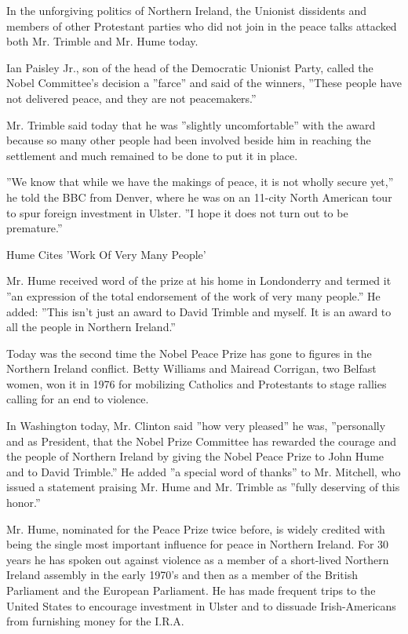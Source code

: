 In the unforgiving politics of Northern Ireland, the Unionist dissidents
and members of other Protestant parties who did not join in the peace
talks attacked both Mr. Trimble and Mr. Hume today.

Ian Paisley Jr., son of the head of the Democratic Unionist Party,
called the Nobel Committee's decision a ''farce'' and said of the
winners, ''These people have not delivered peace, and they are not
peacemakers.''

Mr. Trimble said today that he was ''slightly uncomfortable'' with the
award because so many other people had been involved beside him in
reaching the settlement and much remained to be done to put it in place.

''We know that while we have the makings of peace, it is not wholly
secure yet,'' he told the BBC from Denver, where he was on an 11-city
North American tour to spur foreign investment in Ulster. ''I hope it
does not turn out to be premature.''

Hume Cites 'Work Of Very Many People'

Mr. Hume received word of the prize at his home in Londonderry and
termed it ''an expression of the total endorsement of the work of very
many people.'' He added: ''This isn't just an award to David Trimble and
myself. It is an award to all the people in Northern Ireland.''

Today was the second time the Nobel Peace Prize has gone to figures in
the Northern Ireland conflict. Betty Williams and Mairead Corrigan, two
Belfast women, won it in 1976 for mobilizing Catholics and Protestants
to stage rallies calling for an end to violence.

In Washington today, Mr. Clinton said ''how very pleased'' he was,
''personally and as President, that the Nobel Prize Committee has
rewarded the courage and the people of Northern Ireland by giving the
Nobel Peace Prize to John Hume and to David Trimble.'' He added ''a
special word of thanks'' to Mr. Mitchell, who issued a statement
praising Mr. Hume and Mr. Trimble as ''fully deserving of this honor.''

Mr. Hume, nominated for the Peace Prize twice before, is widely credited
with being the single most important influence for peace in Northern
Ireland. For 30 years he has spoken out against violence as a member of
a short-lived Northern Ireland assembly in the early 1970's and then as
a member of the British Parliament and the European Parliament. He has
made frequent trips to the United States to encourage investment in
Ulster and to dissuade Irish-Americans from furnishing money for the
I.R.A.

